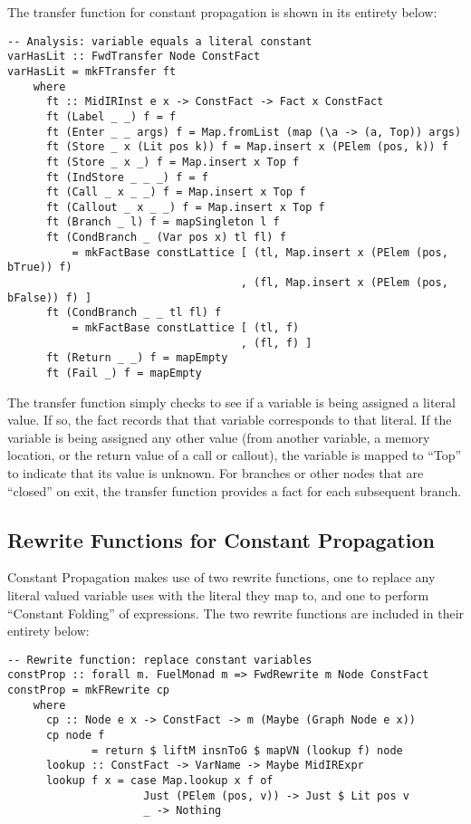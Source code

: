 \documentclass[11pt]{article}
\begin{document}
The transfer function for constant propagation is shown in its entirety below: 

\begin{verbatim}
-- Analysis: variable equals a literal constant
varHasLit :: FwdTransfer Node ConstFact
varHasLit = mkFTransfer ft
    where
      ft :: MidIRInst e x -> ConstFact -> Fact x ConstFact
      ft (Label _ _) f = f
      ft (Enter _ _ args) f = Map.fromList (map (\a -> (a, Top)) args)
      ft (Store _ x (Lit pos k)) f = Map.insert x (PElem (pos, k)) f
      ft (Store _ x _) f = Map.insert x Top f
      ft (IndStore _ _ _) f = f
      ft (Call _ x _ _) f = Map.insert x Top f
      ft (Callout _ x _ _) f = Map.insert x Top f 
      ft (Branch _ l) f = mapSingleton l f
      ft (CondBranch _ (Var pos x) tl fl) f 
          = mkFactBase constLattice [ (tl, Map.insert x (PElem (pos, bTrue)) f)
                                    , (fl, Map.insert x (PElem (pos, bFalse)) f) ]
      ft (CondBranch _ _ tl fl) f 
          = mkFactBase constLattice [ (tl, f)
                                    , (fl, f) ]
      ft (Return _ _) f = mapEmpty
      ft (Fail _) f = mapEmpty

\end{verbatim}

The transfer function simply checks to see if a variable is being assigned a literal value. If so, the fact records that that variable corresponds to that literal. If the variable is being assigned any other value (from another variable, a memory location, or the return value of a call or callout), the variable is mapped to ``Top'' to indicate that its value is unknown. For branches or other nodes that are ``closed'' on exit, the transfer function provides a fact for each subsequent branch. 

\subsection { Rewrite Functions for Constant Propagation }

Constant Propagation makes use of two rewrite functions, one to replace any literal valued variable uses with the literal they map to, and one to perform ``Constant Folding'' of expressions. The two rewrite functions are included in their entirety below: 

\begin{verbatim}
-- Rewrite function: replace constant variables
constProp :: forall m. FuelMonad m => FwdRewrite m Node ConstFact
constProp = mkFRewrite cp 
    where 
      cp :: Node e x -> ConstFact -> m (Maybe (Graph Node e x))
      cp node f 
             = return $ liftM insnToG $ mapVN (lookup f) node
      lookup :: ConstFact -> VarName -> Maybe MidIRExpr
      lookup f x = case Map.lookup x f of 
                     Just (PElem (pos, v)) -> Just $ Lit pos v
                     _ -> Nothing
\end{verbatim}
\end{document}

